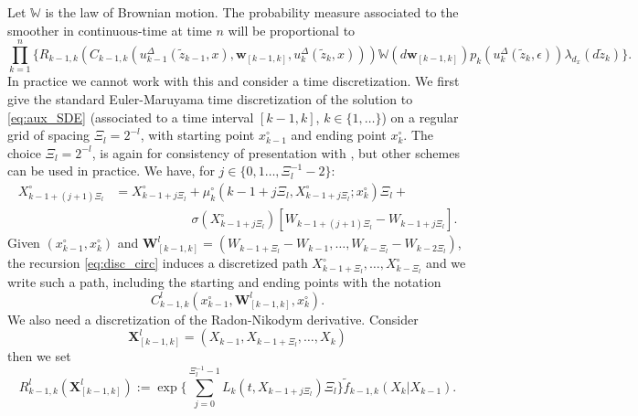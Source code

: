 \documentclass[english,13pt]{article}
\numberwithin{equation}{section}
\begin{document}
Let $\mathbb{W}$ is the law of Brownian motion.
The probability measure associated to the smoother in continuous-time at time $n$ will be proportional to
\begin{equation}\label{eq:smooth_diff}
\prod_{k=1}^n\Big\{ 
R_{k-1,k}(C_{k-1,k}(u_{k-1}^{\Delta}(\widetilde{z}_{k-1},x),\mathbf{w}_{[k-1,k]},u_k^{\Delta}(\widetilde{z}_k,x)))
\mathbb{W}(d\mathbf{w}_{[k-1,k]})
p_k(u_k^{\Delta}(\widetilde{z}_k,\epsilon))\lambda_{d_x}(d\widetilde{z}_k)
\Big\}.%
\end{equation}
In practice we cannot work with this and consider a time discretization. We first give the standard Euler-Maruyama time discretization of the solution to \eqref{eq:aux_SDE} (associated to a time interval $[k-1,k]$, $k\in\{1,\dots\}$) on a regular grid of spacing $\Xi_{l}=2^{-l}$, with starting point $x_{k-1}^{\circ}$ and ending point $x_{k}^{\circ}$.  The choice $\Xi_{l}=2^{-l}$, is again for consistency of presentation with \cite{beskos},  but other schemes can be used in practice.
We have,  for $j\in\{0,1\dots,\Xi_{l}^{-1}-2\}$:
\begin{align}\label{eq:disc_circ}
X_{k-1+(j+1)\Xi_{l}}^{\circ} & = X_{k-1+j\Xi_{l}}^{\circ} + 
\mu_{k}^{\circ}(k-1+j\Xi_{l},X^{\circ}_{k-1+j\Xi_{l}}; x_{k}^\circ)\Xi_{l} + 
\nonumber \\ &\qquad\qquad\qquad
\sigma(X^{\circ}_{k-1+j\Xi_{l}})\left[W_{k-1+(j+1)\Xi_{l}}-W_{k-1+j\Xi_{l}}\right].
\end{align}
Given $(x_{k-1}^{\circ},x_{k}^{\circ})$ and $\mathbf{W}_{[k-1,k]}^l=(W_{k-1+\Xi_{l}}-W_{k-1},\dots,W_{k-\Xi_l}-W_{k-2\Xi_{l}})$,  the recursion \eqref{eq:disc_circ} induces a discretized path 
$X_{k-1+\Xi_{l}}^{\circ},\dots,X_{k-\Xi_{l}}^{\circ}$ and we write such a path, including the starting and ending points with the notation
$$
C_{k-1,k}^l(x_{k-1}^{\circ},\mathbf{W}_{[k-1,k]}^l,x_{k}^{\circ}).
$$
We also need a discretization of the Radon-Nikodym derivative.  Consider 
$$
\mathbf{X}_{[k-1,k]}^l=(X_{k-1},X_{k-1+\Xi_{l}},\dots,X_k)
$$ 
then we set
$$
R_{k-1,k}^l(\mathbf{X}_{[k-1,k]}^l) := 
\exp\Big\{ \sum_{j=0}^{\Xi_{l}^{-1}-1} 
L_{k}(t,X_{k-1+j\Xi_{l}})\Xi_{l}\Big\}\tilde{f}_{k-1,k}(X_{k}|X_{k-1}).%
$$
\end{document}
